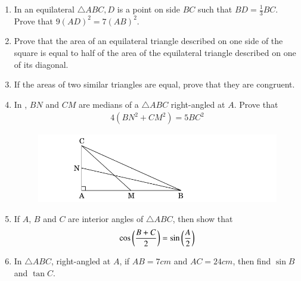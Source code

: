 \begin{enumerate}
	\item In an equilateral $\triangle ABC, D$ is a point on side $BC$ such that $ BD =\frac{1}{3}BC$. Prove that $9(AD)^2 = 7(AB)^2$.
	\hfill{}
\item Prove that the area of an equilateral triangle described on one side of the square is equal to half of the area of the equilateral triangle described on one of its diagonal.
	\hfill{}\item If the areas of two similar triangles are equal, prove that they are congruent.
\hfill{}
\item In , $BN$ and $CM$ are medians of a $\triangle ABC$ right-angled at $A$. Prove that \begin{align*}4(BN^2 +CM^2) = 5BC^2\end{align*} 
\begin{figure}[H]
\centering
\includegraphics[width=\columnwidth]{cbse/figs/rightangled}
\caption{}
\label{fig:rightangled4}
\end{figure}
%
\hfill{}\item If $A$, $B$ and $C$ are interior angles of $ \triangle ABC$, then show that
\hfill{} 
	\begin{align*}
	    \cos \left(\frac{B + C}{2}\right)=\sin \left(\frac{A}{2}\right)
	\end{align*}
%      
\item  In $\triangle ABC$, right-angled at $A$, if $AB=7 cm$ and $AC=24 cm$, then find $\sin B$
and $\tan C$.
%


\end{enumerate}
